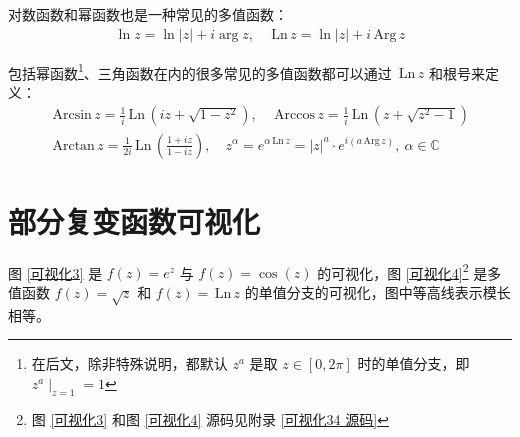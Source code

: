 \documentclass[UTF8]{report}
\def\Arg{\mathrm{\,Arg\,}}
\def\Ln{\mathrm{\,Ln\,}}
\def\Arccos{\mathrm{\,Arccos\,}}
\def\Arcsin{\mathrm{\,Arcsin\,}}
\def\Arctan{\mathrm{\,Arctan\,}}
\def\C{\mathbb{C}}
\theoremstyle{MyLineTheoremStyle} %
\theoremstyle{MyBlockTheoremStyle} %
\theoremstyle{MySubsubsectionStyle} %
\begin{document}
对数函数和幂函数也是一种常见的多值函数：
\begin{gather}
    \ln z = \ln | z | + i\arg z,\quad
    \Ln z = \ln | z | + i\Arg z
\end{gather}

包括幂函数\footnote{在后文，除非特殊说明，都默认 $z^a$ 是取 $z \in [0, 2\pi]$ 时的单值分支，即 $z^a \mid_{z=1} = 1$}、三角函数在内的很多常见的多值函数都可以通过 $\Ln z$ 和根号来定义：
\begin{gather}
    \Arcsin z = \frac{1}{i}\Ln (iz + \sqrt{1-z^2} ),\quad
    \Arccos z = \frac{1}{i}\Ln (z + \sqrt{z^2 - 1} ) \\
    \Arctan z = \frac{1}{2i}\Ln(\frac{1+iz}{1-iz}) ,\quad
    z^\alpha = e^{\alpha \Ln z}= | z |^a \cdot e^{i\left(a \Arg z\right)},\  \alpha \in \C
\end{gather}


\section{部分复变函数可视化}

图 \ref{可视化3} 是 $f(z) = e^z$ 与 $f(z) = \cos (z)$ 的可视化，图 \ref{可视化4}\footnote{图 \ref{可视化3} 和图 \ref{可视化4} 源码见附录 \ref{可视化34 源码}} 是多值函数 $f(z) = \sqrt{z}$ 和 $f(z) = \Ln z$ 的单值分支的可视化，图中等高线表示模长相等。
\end{document}
